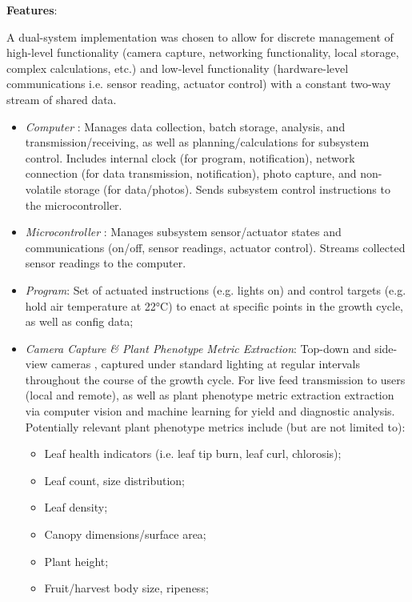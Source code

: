 \clearpage

\textbf{Features}:

A dual-system implementation was chosen to allow for discrete management of high-level functionality (camera capture, networking functionality, local storage, complex calculations, etc.) and low-level functionality (hardware-level communications i.e. sensor reading, actuator control) with a constant two-way stream of shared data.

\begin{itemize}
    \item \textit{Computer} \cite{raspberrypi}: Manages data collection, batch storage, analysis, and transmission/receiving, as well as planning/calculations for subsystem control. Includes internal clock (for program, notification), network connection (for data transmission, notification), photo capture, and non-volatile storage (for data/photos). Sends subsystem control instructions to the microcontroller.
    \item \textit{Microcontroller} \cite{arduino}: Manages subsystem sensor/actuator states and communications (on/off, sensor readings, actuator control). Streams collected sensor readings to the computer.
    \item \textit{Program}: Set of actuated instructions (e.g. lights on) and control targets (e.g. hold air temperature at 22°C) to enact at specific points in the growth cycle, as well as config data;
    \item \textit{Camera Capture \& Plant Phenotype Metric Extraction}: Top-down and side-view cameras \cite{camera}, captured under standard lighting at regular intervals throughout the course of the growth cycle. For live feed transmission to users (local and remote), as well as plant phenotype metric extraction extraction via computer vision and machine learning for yield and diagnostic analysis. Potentially relevant plant phenotype metrics include (but are not limited to):
    \begin{itemize}
        \item Leaf health indicators (i.e. leaf tip burn, leaf curl, chlorosis);
        \item Leaf count, size distribution;
        \item Leaf density;
        \item Canopy dimensions/surface area;
        \item Plant height;
        \item Fruit/harvest body size, ripeness;
    \end{itemize}

\end{itemize}
